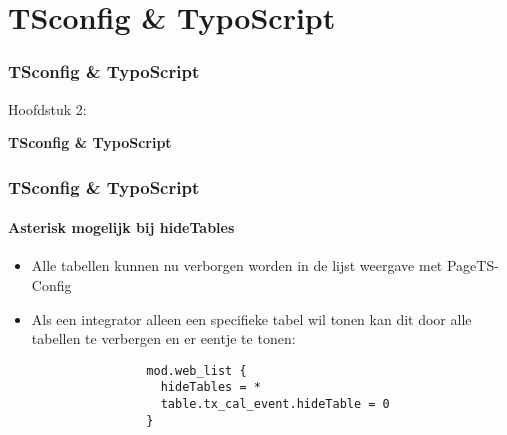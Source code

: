 %

\section{TSconfig \& TypoScript}
\begin{frame}[fragile]
	\frametitle{TSconfig \& TypoScript}

	\begin{center}\huge{Hoofdstuk 2:}\end{center}
	\begin{center}\huge{\color{typo3darkgrey}\textbf{TSconfig \& TypoScript}}\end{center}

\end{frame}

\begin{frame}[fragile]
	\frametitle{TSconfig \& TypoScript}
	\framesubtitle{Asterisk mogelijk bij hideTables}

	\lstset{basicstyle=\tiny\ttfamily}

	\begin{itemize}
		\item Alle tabellen kunnen nu verborgen worden in de lijst weergave
		  	met PageTS-Config

		\item Als een integrator alleen een specifieke tabel wil tonen kan
		 	dit door alle tabellen te verbergen en er eentje te tonen:

			\begin{lstlisting}
				mod.web_list {
				  hideTables = *
				  table.tx_cal_event.hideTable = 0
				}
			\end{lstlisting}

	\end{itemize}

\end{frame}

